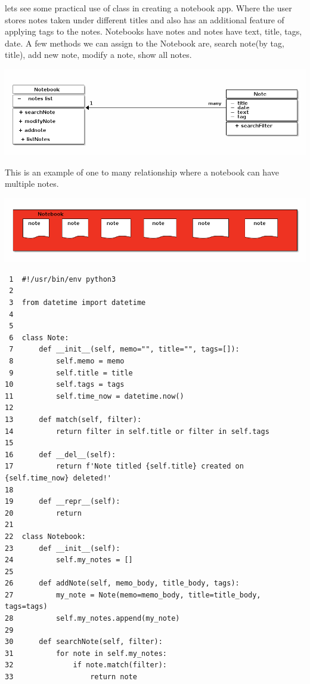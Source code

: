 \documentclass[11pt]{article}
\begin{document}
lets see some practical use of class in creating a notebook app. Where the user stores notes taken under different titles and also has an additional feature of applying tags to the notes. Notebooks have notes and notes have text, title, tags, date. A few methods we can assign to the Notebook are, search note(by tag, title), add new note, modify a note, show all notes.

\begin{center}
\includegraphics[width=.9\linewidth]{./img/notes.png}
\end{center}


This is an example of one to many relationship where a notebook can have multiple notes.

\begin{center}
\includegraphics[width=.9\linewidth]{./img/noteToNotesRelation.png}
\end{center}


\begin{verbatim}
 1  #!/usr/bin/env python3
 2  
 3  from datetime import datetime
 4  
 5  
 6  class Note:
 7      def __init__(self, memo="", title="", tags=[]):
 8          self.memo = memo
 9          self.title = title
10          self.tags = tags
11          self.time_now = datetime.now()
12  
13      def match(self, filter):
14          return filter in self.title or filter in self.tags
15  
16      def __del__(self):
17          return f'Note titled {self.title} created on {self.time_now} deleted!'
18  
19      def __repr__(self):
20          return 
21  
22  class Notebook:
23      def __init__(self):
24          self.my_notes = []
25  
26      def addNote(self, memo_body, title_body, tags):
27          my_note = Note(memo=memo_body, title=title_body, tags=tags)
28          self.my_notes.append(my_note)
29  
30      def searchNote(self, filter):
31          for note in self.my_notes:
32              if note.match(filter):
33                  return note
\end{verbatim}
\end{document}
